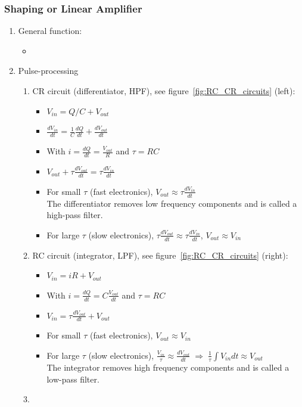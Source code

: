 \subsubsection{Shaping or Linear Amplifier}
\begin{enumerate}
    \item General function:
    \begin{itemize}
        \item 
    \end{itemize}
    \item Pulse-processing
    \begin{enumerate}
        \item CR circuit (differentiator, HPF), see figure~\ref{fig:RC_CR_circuits} (left):
        \begin{itemize}
            \item[] $V_{in}=Q/C+V_{out}$
            \item[] $\frac{dV_{in}}{dt}=\frac{1}{C}\frac{dQ}{dt}+\frac{dV_{out}}{dt}$
            \item[] With $i=\frac{dQ}{dt}=\frac{V_{out}}{R}$ and $\tau=RC$
            \item[] $V_{out}+\tau\frac{dV_{out}}{dt}=\tau\frac{dV_{in}}{dt}$
            \item For small $\tau$ (fast electronics), $V_{out}\approx\tau\frac{dV_{in}}{dt}$\\
            The differentiator removes low frequency components and is called a high-pass filter.
            \item For large $\tau$ (slow electronics), $\tau\frac{dV_{out}}{dt}\approx\tau\frac{dV_{in}}{dt}$, $V_{out}\approx V_{in}$
        \end{itemize}
        \item RC circuit (integrator, LPF), see figure~\ref{fig:RC_CR_circuits} (right):
        \begin{itemize}
            \item[] $V_{in}=iR+V_{out}$
            \item[] With $i=\frac{dQ}{dt}=C\frac{V_{out}}{dt}$ and $\tau=RC$
            \item[] $V_{in}=\tau\frac{dV_{out}}{dt}+V_{out}$
            \item For small $\tau$ (fast electronics), $V_{out}\approx V_{in}$
            \item For large $\tau$ (slow electronics), $\frac{V_{in}}{\tau}\approx \frac{dV_{out}}{dt}\;\Rightarrow\;\frac{1}{\tau}\int V_{in}dt\approx V_{out}$\\
            The integrator removes high frequency components and is called a low-pass filter.
        \end{itemize}
        \item 
    \end{enumerate} 
\end{enumerate}
